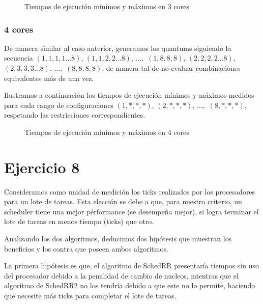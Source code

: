 \documentclass[a4paper,10pt,twoside]{article}
\begin{document}
\begin{figure}[H]
	\centering
	
	\caption{Tiempos de ejecución mínimos y máximos en 3 cores}
\end{figure}


\subsubsection{4 cores}

De manera similar al caso anterior, generamos los quantums siguiendo la secuencia $(1, 1, 1, 1 \ldots 8)$, $(1, 1, 2, 2 \ldots 8)$, $\ldots ,$ $(1, 8, 8, 8)$, $(2, 2, 2, 2 \ldots 8)$, $(2, 3, 3, 3 \ldots 8)$, $\ldots ,$ $(8, 8, 8, 8)$, de manera tal de no evaluar combinaciones equivalentes más de una vez.

Ilustramos a continuación los tiempos de ejecución mínimos y máximos medidos para cada rango de configuraciones $(1, *, *, *)$, $(2, *, *, *)$, $\ldots ,$ $(8, *, *, *)$, respetando las restricciones correspondientes.

\begin{figure}[H]
	\centering
	
	\caption{Tiempos de ejecución mínimos y máximos en 4 cores}
\end{figure}




\section{Ejercicio 8}

Consideramos como unidad de medición los ticks realizados por los procesadores para un lote de tareas. Esta elección se debe a que, para nuestro criterio, un scheduler tiene una mejor pérformance (se desempeña mejor), si logra terminar el lote de tareas en menos tiempo (ticks) que otro.

Analizando los dos algoritmos, deducimos dos hipótesis que muestran los beneficios y los contra que poseen ambos algoritmos.

La primera hipótesis es que, el algoritmo de SchedRR presentaría tiempos sin uso del procesador debido a la penalidad de cambio de nucleos, mientras que el algoritmo de SchedRR2 no los tendría debido a que este no lo permite, haciendo que necesite más ticks para completar el lote de tareas.
\end{document}

